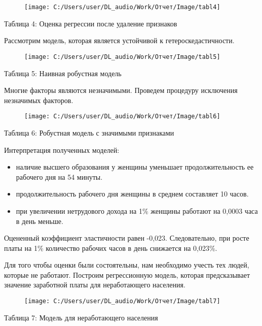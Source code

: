\documentclass[a4paper,12pt]{article}
\begin{document}
	\begin{figure}[H]
		\centering
		\texttt{[image: C:/Users/user/DL\_audio/Work/Отчет/Image/tabl4]}
		\label{fig:tabl4}
	\end{figure}
	\begin{center} Таблица 4: Оценка регрессии после удаление признаков
	\end{center}
	Рассмотрим модель, которая является устойчивой к гетероскедастичности.
	\begin{figure}[H]
		\centering
		\texttt{[image: C:/Users/user/DL\_audio/Work/Отчет/Image/tabl5]}
		\label{fig:tabl5}
	\end{figure}
	\begin{center} Таблица 5: Наивная робустная модель
\end{center}
	 	Многие факторы являются незначимыми. Проведем процедуру исключения незначимых факторов.
	 	
	 	\begin{figure}[H]
	 		\centering
	 		\texttt{[image: C:/Users/user/DL\_audio/Work/Отчет/Image/tabl6]}
	 		\label{fig:tabl6}
	 	\end{figure}
 		\begin{center} Таблица 6: Робустная модель с значимыми признаками
 	\end{center}
	 	Интерпретация полученных моделей: 
	 	\begin{itemize}
	 		\item наличие высшего образования у женщины уменьшает продолжительность ее рабочего дня на 54 минуты.
	 		\item продолжительность рабочего дня женщины в среднем составляет 10 часов.
	 		\item при увеличении нетрудового дохода на 1\% женщины работают на 0,0003 часа в день меньше.
	 		
	 	\end{itemize}
 	
 Оцененный коэффициент эластичности равен -0,023. Следовательно, при росте платы на 1\% количество рабочих часов в день снижается на 0,023\%.
 
 Для того чтобы оценки были состоятельны, нам необходимо учесть тех людей, которые не работают. Построим регрессионную модель, которая предсказывает значение заработной платы для неработающего населения.
 
 \begin{figure}[H]
 	\centering
 	\texttt{[image: C:/Users/user/DL\_audio/Work/Отчет/Image/tabl7]}
 	\label{fig:tabl7}
 \end{figure}
\begin{center}
	Таблица 7: Модель для неработающего населения
\end{center}
\end{document}
